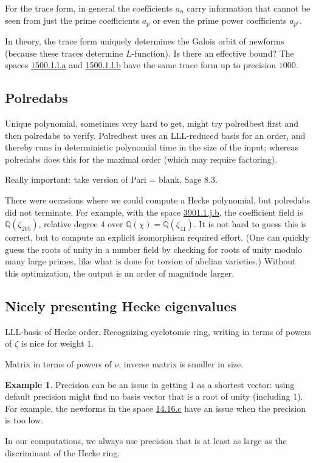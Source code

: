 \documentclass[11pt]{amsart}
\numberwithin{equation}{subsection}
\theoremstyle{plain}
\theoremstyle{definition}
\newtheorem{exm}[equation]{Example}
\newcommand{\Q}{\mathbb{Q}}
\begin{document}
For the trace form, in general the coefficients $a_n$ carry information that cannot be seen from just the prime coefficients $a_p$ or even the prime power coefficients $a_{p^e}$.

In theory, the trace form uniquely determines the Galois orbit of newforms (because these traces determine $L$-function).  Is there an effective bound?  The spaces \href{http://cmfs.lmfdb.xyz/ModularForm/GL2/Q/holomorphic/1500/1/l/a/}{\textsf{1500.1.l.a}} and \href{http://cmfs.lmfdb.xyz/ModularForm/GL2/Q/holomorphic/1500/1/l/b/}{\textsf{1500.1.l.b}} have the same trace form up to precision $1000$.  

\subsection{Polredabs}

Unique polynomial, sometimes very hard to get, might try polredbest first and then polredabs to verify.  Polredbest uses an LLL-reduced basis for an order, and thereby runs in deterministic polynomial time in the size of the input; whereas polredabs does this for the maximal order (which may require factoring).

Really important: take version of Pari = blank, Sage 8.3.

There were occasions where we could compute a Hecke polynomial, but polredabs did not terminate.  For example, with the space \href{http://cmfs.lmfdb.xyz/ModularForm/GL2/Q/holomorphic/3901/1/j/b/}{3901.1.j.b}, the coefficient field is $\Q(\zeta_{205})$, relative degree $4$ over $\Q(\chi)=\Q(\zeta_{41})$.  It is not hard to guess this is correct, but to compute an explicit isomorphism required effort.  (One can quickly guess the roots of unity in a number field by checking for roots of unity modulo many large primes, like what is done for torsion of abelian varieties.)  Without this optimization, the output is an order of magnitude larger.

\subsection{Nicely presenting Hecke eigenvalues}  \label{sec:LLLbasis}

LLL-basis of Hecke order.  Recognizing cyclotomic ring, writing in terms of powers of $\zeta$ is nice for weight $1$.

Matrix in terms of powers of $\nu$, inverse matrix is smaller in size.

\begin{exm}
Precision can be an issue in getting $1$ as a shortest vector: using default precision might find no basis vector that is a root of unity (including $1$).  For example, the newforms in the space \href{http://cmfs.lmfdb.xyz/ModularForm/GL2/Q/holomorphic/14/16/c/}{\textsf{14.16.c}} have an issue when the precision is too low.  

In our computations, we always use precision that is at least as large as the discriminant of the Hecke ring.  
\end{exm}
\end{document}

